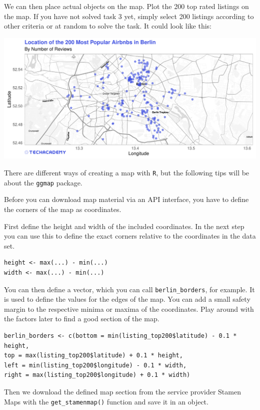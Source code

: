 \documentclass[
  11pt,
]{article}
\newenvironment{tips}[1]
  {
  \begin{itemize}
  \footnotesize
  \renewcommand{\labelitemi}{
    \raisebox{-.7\height}[0pt][0pt]{
      {\setkeys{Gin}{width=3em,keepaspectratio}
        \texttt{[image: images/\#1.png]}}
    }
  }
  \setlength{\fboxsep}{1em}
  \begin{rbox}
  \item
  }
  {
  \end{rbox}
  \end{itemize}
  }
\begin{document}
We can then place actual objects on the map. Plot the 200 top rated listings on the map. If you have not solved task 3 yet, simply select 200 listings according to other criteria or at random to solve the task. It could look like this:

\begin{center}\includegraphics[width=1\linewidth]{plot/4_1_map_top200_simple} \end{center}

\begin{tips}r
There are different ways of creating a map with \texttt{R}, but the following tips will be about the \texttt{ggmap} package.

Before you can download map material via an API interface, you have to define the corners of the map as coordinates.

First define the height and width of the included coordinates. In the next step you can use this to define the exact corners relative to the coordinates in the data set.

\begin{verbatim}
height <- max(...) - min(...)
width <- max(...) - min(...)
\end{verbatim}

You can then define a vector, which you can call \texttt{berlin\_borders}, for example. It is used to define the values for the edges of the map. You can add a small safety margin to the respective minima or maxima of the coordinates. Play around with the factors later to find a good section of the map.

\begin{verbatim}
berlin_borders <- c(bottom = min(listing_top200$latitude) - 0.1 * height,
top = max(listing_top200$latitude) + 0.1 * height,
left = min(listing_top200$longitude) - 0.1 * width,
right = max(listing_top200$longitude) + 0.1 * width)
\end{verbatim}

Then we download the defined map section from the service provider Stamen Maps with the \texttt{get\_stamenmap()} function and save it in an object.

\end{tips}
\end{document}
